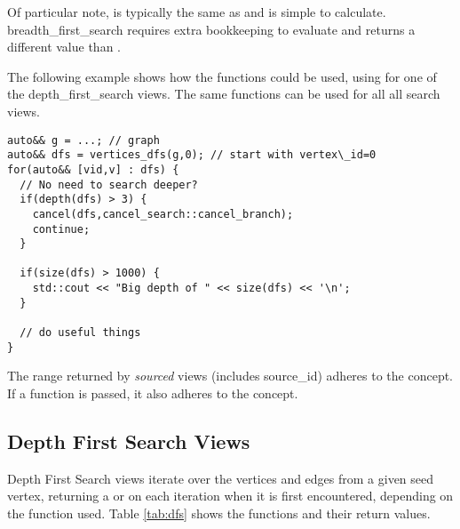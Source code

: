 Of particular note,  is typically the same as  and is simple to calculate. breadth\_first\_search requires extra bookkeeping to evaluate  and returns a different value than .

The following example shows how the functions  could be used, using  for one of the depth\_first\_search views. The same functions can be used for all all search views.
\begin{lstlisting}
auto&& g = ...; // graph
auto&& dfs = vertices_dfs(g,0); // start with vertex\_id=0
for(auto&& [vid,v] : dfs) {
  // No need to search deeper?
  if(depth(dfs) > 3) {
    cancel(dfs,cancel_search::cancel_branch);
    continue;
  }
  
  if(size(dfs) > 1000) {
    std::cout << "Big depth of " << size(dfs) << '\n';
  }
  
  // do useful things
}
\end{lstlisting}

The range returned by \textit{sourced} views (includes source\_id) adheres to the   concept. If a 
 function is passed, it also adheres to the  concept.

\subsection{Depth First Search Views}

Depth First Search views iterate over the vertices and edges from a given seed vertex, returning a  or  on each iteration when it is first encountered, depending on the function used. 
Table \ref{tab:dfs} shows the functions and their return values.




